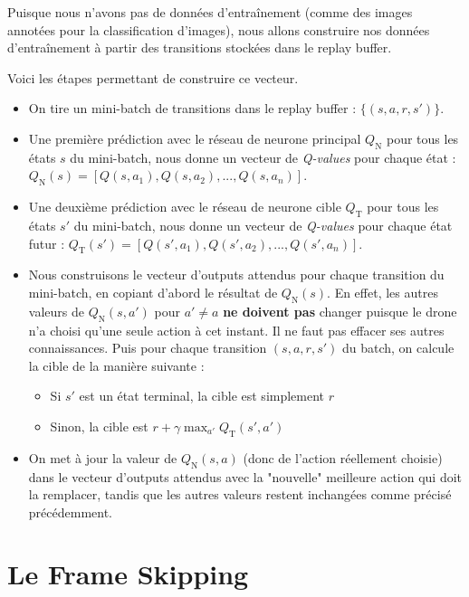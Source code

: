 \documentclass{article}
\begin{document}
\vspace{0.5cm}

Puisque nous n'avons pas de données d'entraînement (comme des images annotées pour la classification d'images), 
nous allons construire nos données d'entraînement à partir des transitions stockées dans le replay buffer.

\vspace{0.5cm}

Voici les étapes permettant de construire ce vecteur.

\begin{itemize}
    \item On tire un mini-batch de transitions dans le replay buffer : $\{(s, a, r, s')\}$.
    \item Une première prédiction avec le réseau de neurone principal $Q_\text{N}$ pour tous les états $s$ du mini-batch, 
    nous donne un vecteur de \textit{Q-values} pour chaque état : $Q_\text{N}(s) = [Q(s, a_1), Q(s, a_2), ..., Q(s, a_n)]$.
    \item Une deuxième prédiction avec le réseau de neurone cible $Q_\text{T}$ pour tous les états $s'$ du mini-batch, 
    nous donne un vecteur de \textit{Q-values} pour chaque état futur : $Q_\text{T}(s') = [Q(s', a_1), Q(s', a_2), ..., Q(s', a_n)]$.
    \item Nous construisons le vecteur d'outputs attendus pour chaque transition du mini-batch, en copiant d'abord le résultat de
    $Q_\text{N}(s)$. En effet, les autres valeurs de $Q_\text{N}(s, a')$ pour $a' \neq a$ \textbf{ne doivent pas}
    changer puisque le drone n'a choisi qu'une seule action à cet instant. Il ne faut pas effacer ses autres connaissances.
    Puis pour chaque transition $(s, a, r, s')$ du batch, on calcule la cible de la manière suivante :
    \begin{itemize}
        \item Si $s'$ est un état terminal, la cible est simplement $r$
        \item Sinon, la cible est $r + \gamma \max_{a'} Q_\text{T}(s', a')$
    \end{itemize}
    \item On met à jour la valeur de $Q_\text{N}(s, a)$ (donc de l'action réellement choisie) dans le vecteur d'outputs attendus avec la "nouvelle" meilleure action qui doit la remplacer,
     tandis que les autres valeurs restent inchangées comme précisé précédemment.
\end{itemize}


\section{Le Frame Skipping}
\end{document}

